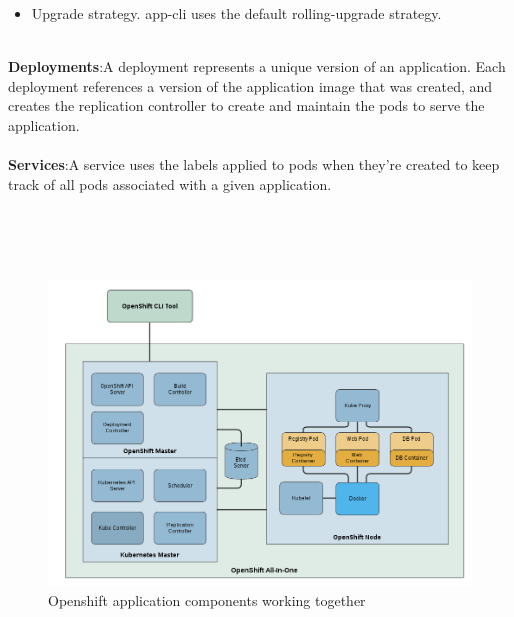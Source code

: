 \documentclass[11pt]{report}
\begin{document}
\begin{itemize}
\begin{itemize}
			\item Upgrade strategy. app-cli uses the default rolling-upgrade strategy.
		\end{itemize}
		\ \\
		\textbf{Deployments}:A deployment represents a unique version of an application. Each deployment references a version of the application image that was created, and creates the replication controller to create and maintain the pods to serve the application.\\
		\ \\
		\textbf{Services}:A service uses the labels applied to pods when they’re created to keep track of all pods associated with a given application.
	\end{itemize}
	\ \\
	\ \\
	\ \\
		\begin{figure}[h!]
    	\begin{center}
    	   	\includegraphics[scale=0.5]{openshiftallinone.png}
    		\caption{Openshift application components working together\cite{Appcomp}}
    	  \end{center}
	  
		\end{figure}
	\ \\
	\ \\
	
	\pagebreak
\end{document}
